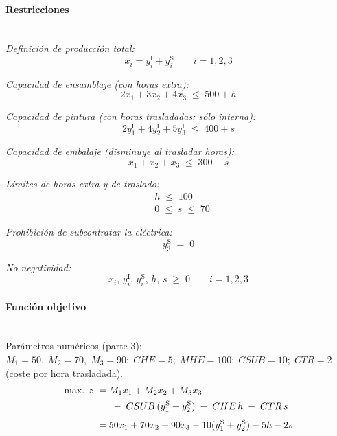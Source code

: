 \paragraph{Restricciones}\mbox{}\\
\textit{Definición de producción total:}
\begin{equation}
x_i = y_i^{\mathrm{I}} + y_i^{\mathrm{S}} \qquad i=1,2,3
\end{equation}

\textit{Capacidad de ensamblaje (con horas extra):}
\begin{equation}
2x_1 + 3x_2 + 4x_3 \;\leq\; 500 + h
\end{equation}

\textit{Capacidad de pintura (con horas trasladadas; sólo interna):}
\begin{equation}
2y_1^{\mathrm{I}} + 4y_2^{\mathrm{I}} + 5y_3^{\mathrm{I}} \;\leq\; 400 + s
\end{equation}

\textit{Capacidad de embalaje (disminuye al trasladar horas):}
\begin{equation}
x_1 + x_2 + x_3 \;\leq\; 300 - s
\end{equation}

\textit{Límites de horas extra y de traslado:}
\begin{align}
& h \;\leq\; 100 \\
& 0 \;\leq\; s \;\leq\; 70
\end{align}

\textit{Prohibición de subcontratar la eléctrica:}
\begin{equation}
y_3^{\mathrm{S}} \;=\; 0
\end{equation}

\textit{No negatividad:}
\begin{equation}
x_i,\, y_i^{\mathrm{I}},\, y_i^{\mathrm{S}},\, h,\, s \;\geq\; 0 \qquad i=1,2,3
\end{equation}

\paragraph{Función objetivo}\mbox{}\\
Parámetros numéricos (parte 3): 
\(
M_1=50,\; M_2=70,\; M_3=90;\;
CHE=5;\; MHE=100;\; CSUB=10;\; CTR=2
\) (coste por hora trasladada).
\begin{align}
\mbox{max. } z \;=\;& M_1x_1 + M_2x_2 + M_3 x_3 \notag\\
&\;-\; CSUB\,(y_1^{\mathrm{S}}+y_2^{\mathrm{S}}) \;-\; CHE\,h \;-\; CTR\,s \notag\\[1mm]
=\;& 50x_1 + 70x_2 + 90x_3 - 10(y_1^{\mathrm{S}}+y_2^{\mathrm{S}}) - 5h - 2s
\end{align}

